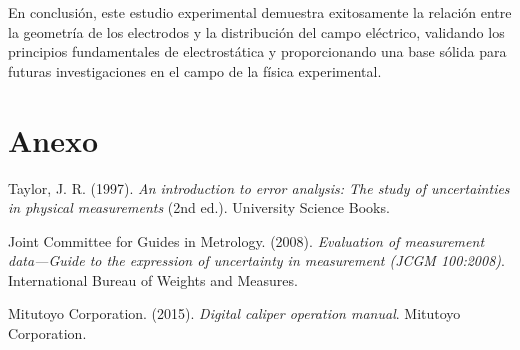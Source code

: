 \documentclass[11pt,twocolumn]{article}
\begin{document}
En conclusión, este estudio experimental demuestra exitosamente la relación entre la geometría de los electrodos y la distribución del campo eléctrico, validando los principios fundamentales de electrostática y proporcionando una base sólida para futuras investigaciones en el campo de la física experimental.

\section{Anexo}

\begin{thebibliography}{9}

 Taylor, J. R. (1997). \textit{An introduction to error analysis: The study of uncertainties in physical measurements} (2nd ed.). University Science Books.

 Joint Committee for Guides in Metrology. (2008). \textit{Evaluation of measurement data—Guide to the expression of uncertainty in measurement (JCGM 100:2008)}. International Bureau of Weights and Measures.

 Mitutoyo Corporation. (2015). \textit{Digital caliper operation manual}. Mitutoyo Corporation.

\end{thebibliography}
\end{document}
